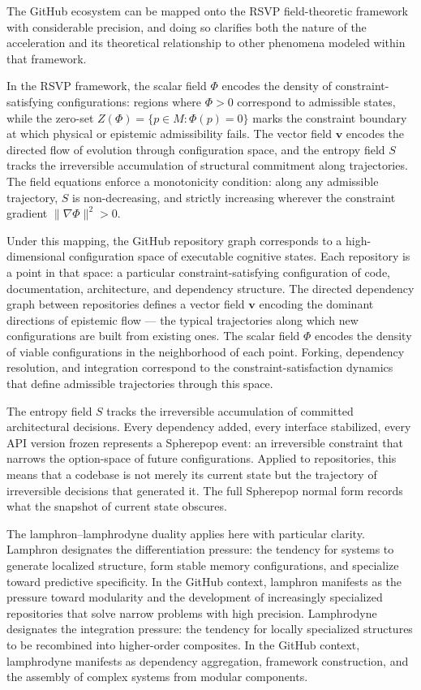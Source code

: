 \documentclass[11pt]{article}
\begin{document}
The GitHub ecosystem can be mapped onto the RSVP field-theoretic framework with
considerable precision, and doing so clarifies both the nature of the
acceleration and its theoretical relationship to other phenomena modeled within
that framework.

In the RSVP framework, the scalar field $\Phi$ encodes the density of
constraint-satisfying configurations: regions where $\Phi > 0$ correspond to
admissible states, while the zero-set $Z(\Phi) = \{p \in M : \Phi(p) = 0\}$
marks the constraint boundary at which physical or epistemic admissibility fails.
The vector field $\mathbf{v}$ encodes the directed flow of evolution through
configuration space, and the entropy field $S$ tracks the irreversible
accumulation of structural commitment along trajectories. The field equations
enforce a monotonicity condition: along any admissible trajectory, $S$ is
non-decreasing, and strictly increasing wherever the constraint gradient
$\|\nabla\Phi\|^2 > 0$.

Under this mapping, the GitHub repository graph corresponds to a
high-dimensional configuration space of executable cognitive states. Each
repository is a point in that space: a particular constraint-satisfying
configuration of code, documentation, architecture, and dependency structure.
The directed dependency graph between repositories defines a vector field
$\mathbf{v}$ encoding the dominant directions of epistemic flow --- the typical
trajectories along which new configurations are built from existing ones. The
scalar field $\Phi$ encodes the density of viable configurations in the
neighborhood of each point. Forking, dependency resolution, and integration
correspond to the constraint-satisfaction dynamics that define admissible
trajectories through this space.

The entropy field $S$ tracks the irreversible accumulation of committed
architectural decisions. Every dependency added, every interface stabilized,
every API version frozen represents a Spherepop event: an irreversible constraint
that narrows the option-space of future configurations. Applied to repositories,
this means that a codebase is not merely its current state but the trajectory of
irreversible decisions that generated it. The full Spherepop normal form records
what the snapshot of current state obscures.

The lamphron--lamphrodyne duality applies here with particular clarity. Lamphron
designates the differentiation pressure: the tendency for systems to generate
localized structure, form stable memory configurations, and specialize toward
predictive specificity. In the GitHub context, lamphron manifests as the pressure
toward modularity and the development of increasingly specialized repositories
that solve narrow problems with high precision. Lamphrodyne designates the
integration pressure: the tendency for locally specialized structures to be
recombined into higher-order composites. In the GitHub context, lamphrodyne
manifests as dependency aggregation, framework construction, and the assembly of
complex systems from modular components.
\end{document}
